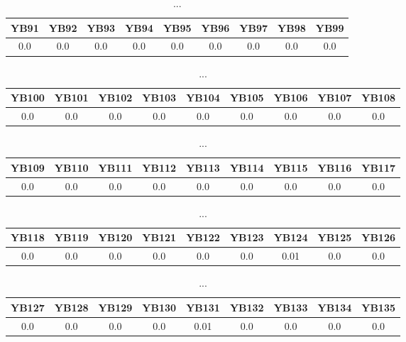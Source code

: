 \documentclass[]{article}
\begin{document}
\begin{table}[h]
      \centering
      \begin{tabular}{|c|c|c|c|c|c|c|c|c|}
            \hline
            YB91 & YB92 & YB93 & YB94 & YB95 & YB96 & YB97 & YB98 & YB99 \\
            \hline
            0.0  & 0.0  & 0.0  & 0.0  & 0.0  & 0.0  & 0.0  & 0.0  & 0.0  \\
            \hline
      \end{tabular}
      \caption{...}
\end{table}
\begin{table}[h]
      \centering
      \begin{tabular}{|c|c|c|c|c|c|c|c|c|}
            \hline
            YB100 & YB101 & YB102 & YB103 & YB104 & YB105 & YB106 & YB107 & YB108 \\
            \hline
            0.0   & 0.0   & 0.0   & 0.0   & 0.0   & 0.0   & 0.0   & 0.0   & 0.0   \\
            \hline
      \end{tabular}
      \caption{...}
\end{table}
\begin{table}[h]
      \centering
      \begin{tabular}{|c|c|c|c|c|c|c|c|c|}
            \hline
            YB109 & YB110 & YB111 & YB112 & YB113 & YB114 & YB115 & YB116 & YB117 \\
            \hline
            0.0   & 0.0   & 0.0   & 0.0   & 0.0   & 0.0   & 0.0   & 0.0   & 0.0   \\
            \hline
      \end{tabular}
      \caption{...}
\end{table}
\begin{table}[h]
      \centering
      \begin{tabular}{|c|c|c|c|c|c|c|c|c|}
            \hline
            YB118 & YB119 & YB120 & YB121 & YB122 & YB123 & YB124 & YB125 & YB126 \\
            \hline
            0.0   & 0.0   & 0.0   & 0.0   & 0.0   & 0.0   & 0.01  & 0.0   & 0.0   \\
            \hline
      \end{tabular}
      \caption{...}
\end{table}
\begin{table}[h]
      \centering
      \begin{tabular}{|c|c|c|c|c|c|c|c|c|}
            \hline
            YB127 & YB128 & YB129 & YB130 & YB131 & YB132 & YB133 & YB134 & YB135 \\
            \hline
            0.0   & 0.0   & 0.0   & 0.0   & 0.01  & 0.0   & 0.0   & 0.0   & 0.0   \\
            \hline
      \end{tabular}
      \caption{...}
\end{table}
\end{document}
